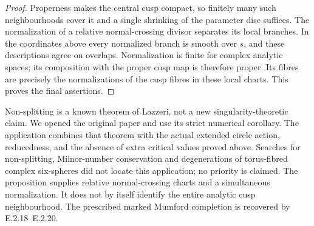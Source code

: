 \begin{proof}
Properness makes the central cusp
compact, so finitely many such
neighbourhoods cover it and a
single shrinking of the parameter
disc suffices.  The normalization
of a relative normal-crossing
divisor separates its local
branches.  In the coordinates
above every normalized branch
is smooth over $s$, and these
descriptions agree on overlaps.
Normalization is finite for
complex analytic spaces; its
composition with the proper
cusp map is therefore proper.
Its fibres are precisely the
normalizations of the cusp
fibres in these local charts.
This proves the final assertions.
\end{proof}

\begin{remark}
Non-splitting is a known theorem of
Lazzeri, not a new singularity-theoretic
claim.  We opened the original paper
and use its strict numerical
corollary.  The application combines
that theorem with the actual extended
circle action, reducedness, and the
absence of extra critical values
proved above.  Searches for
non-splitting, Milnor-number
conservation and degenerations of
torus-fibred complex six-spheres
did not locate this application;
no priority is claimed.  The
proposition supplies relative
normal-crossing charts and a
simultaneous normalization.  It
does not by itself identify the entire
analytic cusp neighbourhood.  The
prescribed marked Mumford completion
is recovered by E.2.18--E.2.20.
\end{remark}
